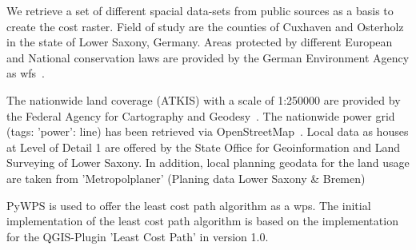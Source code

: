 
We retrieve a set of different spacial data-sets from  public sources as a basis to create the cost raster.
Field of study are the counties of Cuxhaven and Osterholz in the state of Lower Saxony, Germany.
Areas protected by different European and National conservation laws are provided by the German Environment Agency
as \acrfull{wfs}~\cite{noauthor_schutzgebiete_2015}.

The nationwide land coverage (ATKIS) with a scale of 1:250000 are provided by the Federal Agency for Cartography
and Geodesy~\cite{noauthor_digitales_2021}.
The nationwide power grid (tags: 'power': line) has been retrieved via OpenStreetMap~\cite{boeing_osmnx_2017}.
Local data as houses at Level of Detail 1 are offered by the State Office for Geoinformation and Land Surveying of
Lower Saxony\cite{noauthor_opengeodatani_2022}.
In addition, local planning geodata for the land usage are taken
from 'Metropolplaner' (Planing data Lower Saxony \& Bremen)\cite{noauthor_metropolplaner_2022}

PyWPS\cite{noauthor_welcome_2016} is used to offer the least cost path algorithm as a \acrfull{wps}.
The initial implementation of the least cost path algorithm is based on the implementation for the QGIS-Plugin
'Least Cost Path'\cite{noauthor_leastcostpathdijkstra_algorithmpy_2022} in version 1.0.


